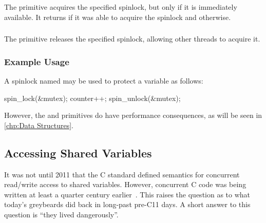 The  primitive acquires the specified spinlock,
but only if it is immediately available.
It returns  if it was able to acquire the spinlock and
 otherwise.

\subsubsection{}

The  primitive releases the specified spinlock,
allowing other threads to acquire it.


\subsubsection{Example Usage}

A spinlock named  may be used to protect a variable
 as follows:

\begin{VerbatimU}
spin_lock(&mutex);
counter++;
spin_unlock(&mutex);
\end{VerbatimU}

\QuickQuizEnd

However, the  and  primitives
do have performance consequences, as will be seen in
\cref{chp:Data Structures}.

\subsection{Accessing Shared Variables}
\label{sec:toolsoftrade:Accessing Shared Variables}

It was not until 2011 that the C standard defined semantics for concurrent
read/write access to shared variables.
However, concurrent C code was being written at least a quarter century
earlier~\cite{Beck85,Inman85}.
This raises the question as to what today's greybeards did back
in long-past pre-C11 days.
A short answer to this question is ``they lived dangerously''.

